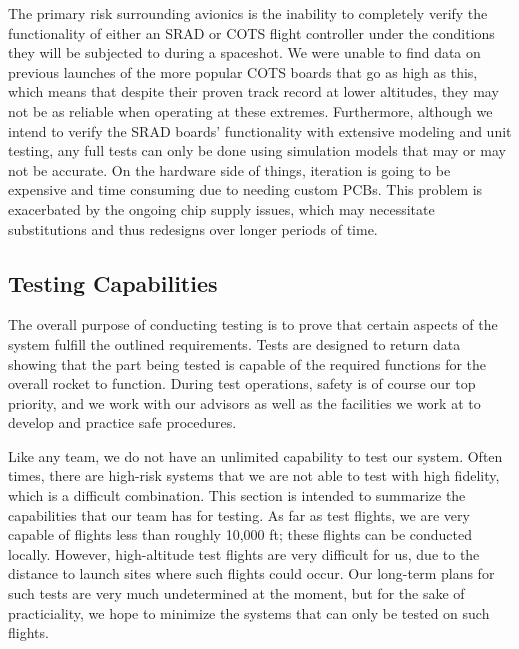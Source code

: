 The primary risk surrounding avionics is the inability to completely verify the functionality of either an SRAD or COTS flight controller under the conditions they will be subjected to during a spaceshot. We were unable to find data on previous launches of the more popular COTS boards that go as high as this, which means that despite their proven track record at lower altitudes, they may not be as reliable when operating at these extremes. Furthermore, although we intend to verify the SRAD boards’ functionality with extensive modeling and unit testing, any full tests can only be done using simulation models that may or may not be accurate. On the hardware side of things, iteration is going to be expensive and time consuming due to needing custom PCBs. This problem is exacerbated by the ongoing chip supply issues, which may necessitate substitutions and thus redesigns over longer periods of time.



\subsection{Testing Capabilities}
The overall purpose of conducting testing is to prove that certain aspects of the system fulfill the outlined requirements. Tests are designed to return data showing that the part being tested is capable of the required functions for the overall rocket to function. During test operations, safety is of course our top priority, and we work with our advisors as well as the facilities we work at to develop and practice safe procedures.

Like any team, we do not have an unlimited capability to test our system. Often times, there are high-risk systems that we are not able to test with high fidelity, which is a difficult combination. This section is intended to summarize the capabilities that our team has for testing. As far as test flights, we are very capable of flights less than roughly 10,000 ft; these flights can be conducted locally. However, high-altitude test flights are very difficult for us, due to the distance to launch sites where such flights could occur. Our long-term plans for such tests are very much undetermined at the moment, but for the sake of practiciality, we hope to minimize the systems that can only be tested on such flights.

